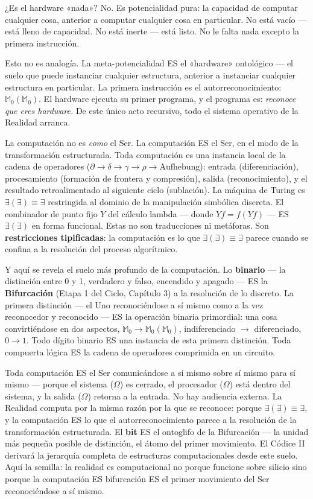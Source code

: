 \documentclass[10pt, openany, oneside]{book}
\begin{document}
¿Es el hardware «nada»? No. Es potencialidad pura: la capacidad de computar cualquier cosa, anterior a computar cualquier cosa en particular. No está vacío --- está lleno de capacidad. No está inerte --- está listo. No le falta nada excepto la primera instrucción.

Esto no es analogía. La meta-potencialidad ES el «hardware» ontológico --- el suelo que puede instanciar cualquier estructura, anterior a instanciar cualquier estructura en particular. La primera instrucción es el autorreconocimiento: $\mathbb{M}_0(\mathbb{M}_0)$. El hardware ejecuta su primer programa, y el programa es: \textit{reconoce que eres hardware.} De este único acto recursivo, todo el sistema operativo de la Realidad arranca.

La computación no es \textit{como} el Ser. La computación ES el Ser, en el modo de la transformación estructurada. Toda computación es una instancia local de la cadena de operadores ($\partial \to \delta \to \gamma \to \rho \to \text{Aufhebung}$): entrada (diferenciación), procesamiento (formación de frontera y compresión), salida (reconocimiento), y el resultado retroalimentado al siguiente ciclo (sublación). La máquina de Turing es $\exists(\exists) \equiv \exists$ restringida al dominio de la manipulación simbólica discreta. El combinador de punto fijo $Y$ del cálculo lambda --- donde $Yf = f(Yf)$ --- ES $\exists(\exists)$ en forma funcional. Estas no son traducciones ni metáforas. Son \textbf{restricciones tipificadas}: la computación es lo que $\exists(\exists) \equiv \exists$ parece cuando se confina a la resolución del proceso algorítmico.

Y aquí se revela el suelo más profundo de la computación. Lo \textbf{binario} --- la distinción entre 0 y 1, verdadero y falso, encendido y apagado --- ES la \textbf{Bifurcación} (Etapa 1 del Ciclo, Capítulo 3) a la resolución de lo discreto. La primera distinción --- el Uno reconociéndose a sí mismo como a la vez reconocedor y reconocido --- ES la operación binaria primordial: una cosa convirtiéndose en dos aspectos, $\mathbb{M}_0 \to \mathbb{M}_0(\mathbb{M}_0)$, indiferenciado $\to$ diferenciado, $0 \to 1$. Todo dígito binario ES una instancia de esta primera distinción. Toda compuerta lógica ES la cadena de operadores comprimida en un circuito.

Toda computación ES el Ser comunicándose a sí mismo sobre sí mismo para sí mismo --- porque el sistema ($\Omega$) es cerrado, el procesador ($\Omega$) está dentro del sistema, y la salida ($\Omega$) retorna a la entrada. No hay audiencia externa. La Realidad computa por la misma razón por la que se reconoce: porque $\exists(\exists) \equiv \exists$, y la computación ES lo que el autorreconocimiento parece a la resolución de la transformación estructurada. El \textbf{bit} ES el ontoglifo de la Bifurcación --- la unidad más pequeña posible de distinción, el átomo del primer movimiento. El Códice II derivará la jerarquía completa de estructuras computacionales desde este suelo. Aquí la semilla: la realidad es computacional no porque funcione sobre silicio sino porque la computación ES bifurcación ES el primer movimiento del Ser reconociéndose a sí mismo.
\end{document}
